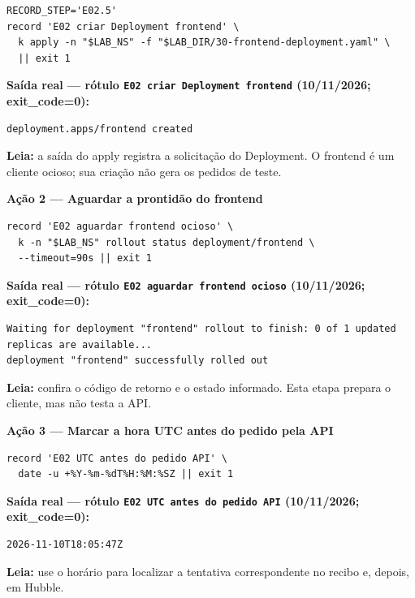 \documentclass[12pt,openany,oneside,a4paper,chapter=TITLE,english,brazil]{abntex2}
\begin{document}
\begin{verbatim}
RECORD_STEP='E02.5'
record 'E02 criar Deployment frontend' \
  k apply -n "$LAB_NS" -f "$LAB_DIR/30-frontend-deployment.yaml" \
  || exit 1
\end{verbatim}

\textbf{Saída real --- rótulo \texttt{E02 criar Deployment frontend} (10/11/2026; exit\_code=0):}

\begin{verbatim}
deployment.apps/frontend created
\end{verbatim}

\textbf{Leia:} a saída do apply registra a solicitação do Deployment. O frontend é um cliente ocioso; sua criação não gera os pedidos de teste.

\textbf{Ação 2 --- Aguardar a prontidão do frontend}

\begin{verbatim}
record 'E02 aguardar frontend ocioso' \
  k -n "$LAB_NS" rollout status deployment/frontend \
  --timeout=90s || exit 1
\end{verbatim}

\textbf{Saída real --- rótulo \texttt{E02 aguardar frontend ocioso} (10/11/2026; exit\_code=0):}

\begin{verbatim}
Waiting for deployment "frontend" rollout to finish: 0 of 1 updated replicas are available...
deployment "frontend" successfully rolled out
\end{verbatim}

\textbf{Leia:} confira o código de retorno e o estado informado. Esta etapa prepara o cliente, mas não testa a API.

\clearpage

\textbf{Ação 3 --- Marcar a hora UTC antes do pedido pela API}

\begin{verbatim}
record 'E02 UTC antes do pedido API' \
  date -u +%Y-%m-%dT%H:%M:%SZ || exit 1
\end{verbatim}

\textbf{Saída real --- rótulo \texttt{E02 UTC antes do pedido API} (10/11/2026; exit\_code=0):}

\begin{verbatim}
2026-11-10T18:05:47Z
\end{verbatim}

\textbf{Leia:} use o horário para localizar a tentativa correspondente no recibo e, depois, em Hubble.
\end{document}
